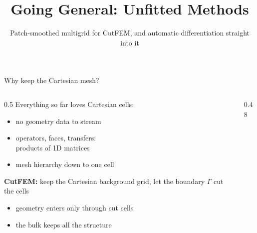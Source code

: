 \documentclass{beamer}
\begin{document}

{
\title{Going General: Unfitted Methods}
\subtitle{Patch-smoothed multigrid for CutFEM, and automatic differentiation straight into it}
\begin{frame}
    \titlepage
\end{frame}
}

\begin{frame}{Why keep the Cartesian mesh?}
    \begin{columns}[T]
        \begin{column}{0.5\textwidth}
            \small
            Everything so far loves \alert{Cartesian cells}:
            \begin{itemize}
                \item no geometry data to stream
                \item operators, faces, transfers:\\ products of \alert{1D matrices}
                \item mesh hierarchy down to one cell
            \end{itemize}
            \vspace{0.5em}
            \pause
            \textbf{CutFEM:} keep the Cartesian background grid, let the boundary $\Gamma$ cut the cells
            \begin{itemize}
                \item geometry enters only through cut cells
                \item the bulk keeps all the structure
            \end{itemize}
        \end{column}
        \begin{column}{0.48\textwidth}
            \centering
            \vspace{0.5em}
\end{column}
\end{columns}
\end{frame}
\end{document}
